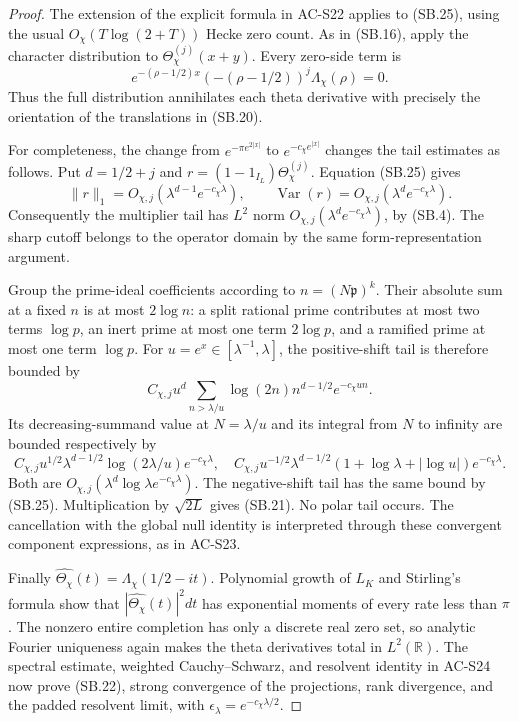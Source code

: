 \begin{proof}
The extension of the explicit formula in AC-S22 applies to
(SB.25), using the usual \(O_\chi(T\log(2+T))\) Hecke zero count.
As in (SB.16), apply the character distribution to
\(\Theta_\chi^{(j)}(x+y)\).
Every zero-side term is
\[
 e^{-(\rho-1/2)x}(-(\rho-1/2))^j\Lambda_\chi(\rho)=0.
 \]
Thus the full distribution annihilates each theta derivative
with precisely the orientation of the translations in (SB.20).

For completeness, the change from \(e^{-\pi e^{2|x|}}\) to
\(e^{-c_\chi e^{|x|}}\) changes the tail estimates as follows.
Put \(d=1/2+j\) and
\(r=(1-1_{I_L})\Theta_\chi^{(j)}\).
Equation (SB.25) gives
\[
 \|r\|_1=O_{\chi,j}(\lambda^{d-1}e^{-c_\chi\lambda}),
 \qquad
 \operatorname{Var}(r)=O_{\chi,j}(\lambda^de^{-c_\chi\lambda}).
\]
Consequently the multiplier tail has \(L^2\) norm
\(O_{\chi,j}(\lambda^de^{-c_\chi\lambda})\), by (SB.4).
The sharp cutoff belongs to the operator domain by the same
form-representation argument.

Group the prime-ideal coefficients according to
\(n=(N\mathfrak p)^k\).  Their absolute sum at a fixed \(n\)
is at most \(2\log n\): a split rational prime contributes
at most two terms \(\log p\), an inert prime at most one
term \(2\log p\), and a ramified prime at most one term
\(\log p\).  For \(u=e^x\in[\lambda^{-1},\lambda]\), the
positive-shift tail is therefore bounded by
\[
 C_{\chi,j}u^d\sum_{n>\lambda/u}
               \log(2n)n^{d-1/2}e^{-c_\chi un}.
\]
Its decreasing-summand value at \(N=\lambda/u\) and its
integral from \(N\) to infinity are bounded respectively by
\[
 C_{\chi,j}u^{1/2}\lambda^{d-1/2}
                  \log(2\lambda/u)e^{-c_\chi\lambda},
 \quad
 C_{\chi,j}u^{-1/2}\lambda^{d-1/2}
       (1+\log\lambda+|\log u|)e^{-c_\chi\lambda}.
\]
Both are \(O_{\chi,j}(\lambda^d\log\lambda
e^{-c_\chi\lambda})\).
The negative-shift tail has the same bound by (SB.25).
Multiplication by \(\sqrt{2L}\) gives (SB.21).
No polar tail occurs.  The cancellation with the global
null identity is interpreted through these convergent
component expressions, as in AC-S23.

Finally
\(\widehat{\Theta_\chi}(t)=\Lambda_\chi(1/2-it)\).
Polynomial growth of \(L_K\) and Stirling's formula show that
\(|\widehat{\Theta_\chi}(t)|^2dt\) has exponential moments
of every rate less than \(\pi\).
The nonzero entire completion has only a discrete real zero
set, so analytic Fourier uniqueness again makes the theta
derivatives total in \(L^2(\mathbb R)\).
The spectral estimate, weighted Cauchy--Schwarz, and resolvent
identity in AC-S24 now prove (SB.22), strong convergence of
the projections, rank divergence, and the padded resolvent
limit, with \(\epsilon_\lambda=e^{-c_\chi\lambda/2}\).
\end{proof}

